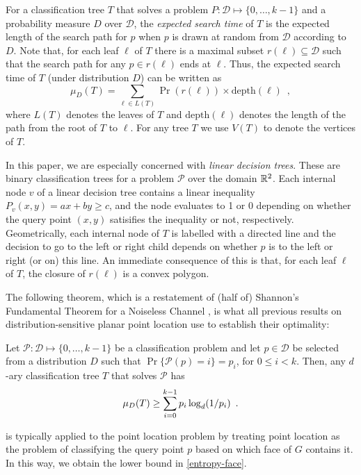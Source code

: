 \documentclass[lotsofwhite]{patmorin}
\newcommand{\depth}{\mathrm{depth}}
\begin{document}
For a classification tree $T$ that solves a problem
$P:\mathcal{D}\mapsto\{0,\ldots,k-1\}$ and a probability measure $D$
over $\mathcal{D}$, the \emph{expected search time} of $T$ is the
expected length of the search path for $p$ when $p$ is drawn at random
from $\mathcal{D}$ according to $D$.  Note that, for each leaf $\ell$
of $T$ there is a maximal subset $r(\ell)\subseteq \mathcal{D}$ such
that the search path for any $p\in r(\ell)$ ends at $\ell$.  Thus, the
expected search time of $T$ (under distribution $D$) can be written as
\[
     \mu_D(T) = \sum_{\ell\in L(T)} \Pr(r(\ell))\times \depth(\ell)
	\enspace ,
\]
where $L(T)$ denotes the leaves of $T$ and $\depth(\ell)$ denotes the
length of the path from the root of $T$ to $\ell$.  For any tree $T$
we use $V(T)$ to denote the vertices of $T$.

In this paper, we are especially concerned with \emph{linear decision
trees}. These are binary classification trees for a problem
$\mathcal{P}$ over the domain $\mathbb{R}^2$.  Each internal node $v$ of a
linear decision tree contains a linear inequality $P_v(x,y)=ax+by \ge
c$, and the node evaluates to 1 or 0 depending on whether the query
point $(x,y)$ satisifies the inequality or not, respectively.
Geometrically, each internal node of $T$ is labelled with a directed
line and the decision to go to the left or right child depends on
whether $p$ is to the left or right (or on) this line.  An immediate
consequence of this is that, for each leaf $\ell$ of $T$, the closure
of $r(\ell)$ is a convex polygon. 

The following theorem, which is a restatement of (half of) Shannon's
Fundamental Theorem for a Noiseless Channel \cite[Theorem 9]{s48}, is
what all previous results on distribution-sensitive planar point
location use to establish their optimality:

\begin{thm}
Let $\mathcal{P}:\mathcal{D}\mapsto \{0,\ldots,k-1\}$ be a classification
problem and let $p\in \mathcal{D}$ be selected from a distribution $D$ such
that $\Pr\{\mathcal{P}(p)= i\}=p_i$, for $0\le i< k$.  Then, any
$d$-ary classification tree $T$ that solves $\mathcal{P}$ has
\begin{equation}
     \mu_D(T) \ge \sum_{i=0}^{k-1} p_i\log_d(1/p_i) \enspace .
	\eqlabel{shannon}
\end{equation}
\end{thm}
 is typically applied to the point location problem by
treating point location as the problem of classifying the query point
$p$ based on which face of $G$ contains it.  In this way, we obtain
the lower bound in \eqref{entropy-face}.
\end{document}
